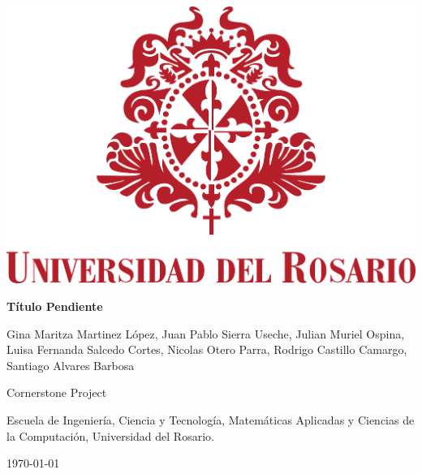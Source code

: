 \hfill
\begin{minipage}{0.17\textwidth}
    \includegraphics[width=\textwidth]{figuras/ur.png} %
\end{minipage}
\hspace{25pt}
\begin{minipage}{0.75\textwidth}

    \Large{\textbf{Título Pendiente}} %
    \vspace{4mm}

    \large{Gina Maritza Martinez López, Juan Pablo Sierra Useche, Julian Muriel Ospina, Luisa Fernanda Salcedo Cortes, Nicolas Otero Parra, Rodrigo Castillo Camargo, Santiago Alvares Barbosa}
    \vspace{2mm}

    Cornerstone Project

    Escuela de Ingeniería, Ciencia y Tecnología, Matemáticas Aplicadas y Ciencias de la Computación, Universidad del Rosario.
    \vspace{1mm}

    \today %

\end{minipage}
